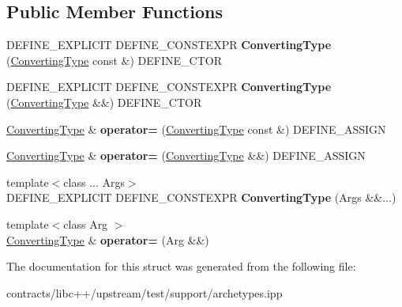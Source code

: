 \subsection*{Public Member Functions}
\begin{DoxyCompactItemize}
\item 
\mbox{\label{struct_converting_type_a9ec6ae041d0a83106db37998667bfc8b}} 
D\+E\+F\+I\+N\+E\+\_\+\+E\+X\+P\+L\+I\+C\+IT D\+E\+F\+I\+N\+E\+\_\+\+C\+O\+N\+S\+T\+E\+X\+PR {\bfseries Converting\+Type} (\mbox{\hyperlink{struct_converting_type}{Converting\+Type}} const \&) D\+E\+F\+I\+N\+E\+\_\+\+C\+T\+OR
\item 
\mbox{\label{struct_converting_type_aa33322770f1376ee63c4a75593937422}} 
D\+E\+F\+I\+N\+E\+\_\+\+E\+X\+P\+L\+I\+C\+IT D\+E\+F\+I\+N\+E\+\_\+\+C\+O\+N\+S\+T\+E\+X\+PR {\bfseries Converting\+Type} (\mbox{\hyperlink{struct_converting_type}{Converting\+Type}} \&\&) D\+E\+F\+I\+N\+E\+\_\+\+C\+T\+OR
\item 
\mbox{\label{struct_converting_type_ae0047438ea87a79fc121d89f10404e71}} 
\mbox{\hyperlink{struct_converting_type}{Converting\+Type}} \& {\bfseries operator=} (\mbox{\hyperlink{struct_converting_type}{Converting\+Type}} const \&) D\+E\+F\+I\+N\+E\+\_\+\+A\+S\+S\+I\+GN
\item 
\mbox{\label{struct_converting_type_ae2b793ac2942761b8f50c026b3a09c63}} 
\mbox{\hyperlink{struct_converting_type}{Converting\+Type}} \& {\bfseries operator=} (\mbox{\hyperlink{struct_converting_type}{Converting\+Type}} \&\&) D\+E\+F\+I\+N\+E\+\_\+\+A\+S\+S\+I\+GN
\item 
\mbox{\label{struct_converting_type_aff7566cb0d3a974477b9411a6074ba01}} 
{\footnotesize template$<$class ... Args$>$ }\\D\+E\+F\+I\+N\+E\+\_\+\+E\+X\+P\+L\+I\+C\+IT D\+E\+F\+I\+N\+E\+\_\+\+C\+O\+N\+S\+T\+E\+X\+PR {\bfseries Converting\+Type} (Args \&\&...)
\item 
\mbox{\label{struct_converting_type_ad204b8bd6d9425adaecc6acf95e02f63}} 
{\footnotesize template$<$class Arg $>$ }\\\mbox{\hyperlink{struct_converting_type}{Converting\+Type}} \& {\bfseries operator=} (Arg \&\&)
\end{DoxyCompactItemize}


The documentation for this struct was generated from the following file\+:\begin{DoxyCompactItemize}
\item 
contracts/libc++/upstream/test/support/archetypes.\+ipp\end{DoxyCompactItemize}
